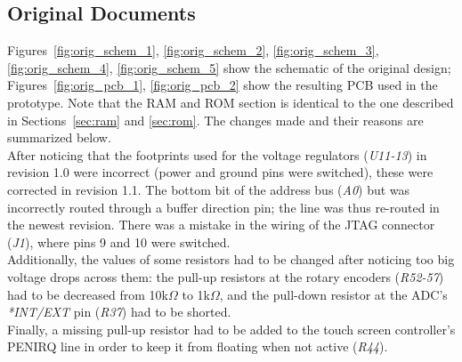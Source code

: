 \documentclass[titlepage]{scrartcl}
\begin{document}
	
	\clearpage

	\begin{appendices}

	\section{Original Documents \label{original}}
	Figures~\ref{fig:orig_schem_1}, \ref{fig:orig_schem_2}, \ref{fig:orig_schem_3}, \ref{fig:orig_schem_4}, \ref{fig:orig_schem_5} show the schematic of the original design; Figures~\ref{fig:orig_pcb_1}, \ref{fig:orig_pcb_2} show the resulting PCB used in the prototype. Note that the RAM and ROM section is identical to the one described in Sections~\ref{sec:ram} and \ref{sec:rom}. The changes made and their reasons are summarized below.\\

	After noticing that the footprints used for the voltage regulators (\textit{U11-13}) in revision 1.0 were incorrect (power and ground pins were switched), these were corrected in revision 1.1. The bottom bit of the address bus (\textit{A0}) but was incorrectly routed through a buffer direction pin; the line was thus re-routed in the newest revision. There was a mistake in the wiring of the JTAG connector (\textit{J1}), where pins 9 and 10 were switched.\\

	Additionally, the values of some resistors had to be changed after noticing too big voltage drops across them: the pull-up resistors at the rotary encoders (\textit{R52-57}) had to be decreased from 10k$\Omega$ to 1k$\Omega$, and the pull-down resistor at the ADC's \textit{*INT/EXT} pin (\textit{R37}) had to be shorted.\\

	Finally, a missing pull-up resistor had to be added to the touch screen controller's PENIRQ line in order to keep it from floating when not active (\textit{R44}).\\


\end{appendices}
\end{document}
